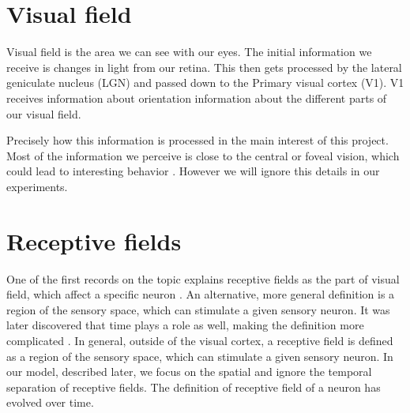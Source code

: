 \section{Visual field}





Visual field is the area we can see with our eyes. The initial information we receive is changes in light from our retina. This then gets processed by the lateral geniculate nucleus (LGN) and passed down to the Primary visual cortex (V1). V1 receives information about orientation information about the different parts of our visual field. 


Precisely how this information is processed in the main interest of this project. Most of the information we perceive is close to the central or foveal vision, which could lead to interesting behavior \cite{knight2008drastically}. However we will ignore this details in our experiments.


\section{Receptive fields}

One of the first records on the topic explains receptive fields as the part of visual field, which affect a specific neuron \cite{Hartline700}. An alternative, more general definition is a region of the sensory space, which can stimulate a given sensory neuron.  It was later discovered that time plays a role as well, making the definition more complicated \cite{deangelis1995receptive}. In general, outside of the visual cortex, a receptive field is defined as a region of the sensory space, which can stimulate a given sensory neuron. In our model, described later, we focus on the spatial and ignore the temporal separation of receptive fields.
The definition of receptive field of a neuron has evolved over time.


